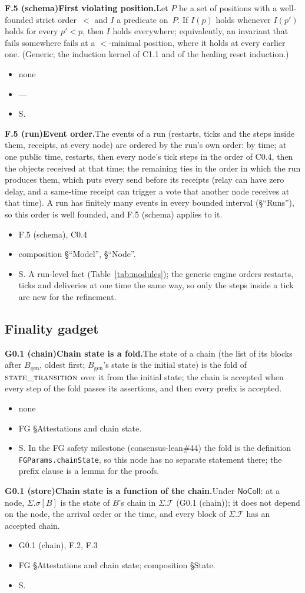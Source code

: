 \documentclass{article}
\newcommand{\genesis}{B_{\mathrm{gen}}}
\newcommand{\T}{\mathcal T}
\newcommand{\fname}[1]{\text{\textsc{#1}}}
\newcommand{\dagnode}[6]{%
\par\medskip\noindent\textbf{#1\enspace #2.}\enspace #3
\begin{itemize}[leftmargin=2.2em,itemsep=0pt,topsep=2pt]
\item[\emph{Uses}] #4
\item[\emph{Evid.}] #5
\item[\emph{Task}] #6
\end{itemize}}
\begin{document}
\dagnode{F.5 (schema)}{First violating position}{Let $P$ be a set of
positions with a well-founded strict order~$<$ and $I$ a predicate on~$P$.  If
$I(p)$ holds whenever $I(p')$ holds for every $p'<p$, then $I$ holds everywhere;
equivalently, an invariant that fails somewhere fails at a $<$-minimal position,
where it holds at every earlier one.  (Generic; the induction kernel of C1.1 and
of the healing reset induction.)}
{none}{---}{S.}

\dagnode{F.5 (run)}{Event order}{The events of a run (restarts, ticks and the
steps inside them, receipts, at every node) are ordered by the run's own order:
by time; at one public time, restarts, then every node's tick steps in the
order of C0.4, then the objects received at that time; the remaining ties in
the order in which the run produces them, which puts every send before its
receipts (relay can have zero delay, and a same-time receipt can trigger a vote
that another node receives at that time).  A run has finitely many events in
every bounded interval (\S``Runs''), so this order is well founded, and F.5
(schema) applies to it.}
{F.5 (schema), C0.4}{composition \S``Model'', \S``Node''.}{S.  A run-level fact
(Table~\ref{tab:modules}); the generic engine orders restarts, ticks and
deliveries at one time the same way, so only the steps inside a tick are new
for the refinement.}

\subsection{Finality gadget}

\dagnode{G0.1 (chain)}{Chain state is a fold}{The state of a chain (the
list of its blocks after $\genesis$, oldest first; $\genesis$'s state is the
initial state) is the fold of $\fname{state\_transition}$
over it from the initial state; the chain is accepted when every step of the
fold passes its assertions, and then every prefix is accepted.}
{none}{FG \S Attestations and chain state.}{S.  In the FG safety milestone
(consensus-lean\#44) the fold is the definition
\texttt{FGParams.chainState}, so this node has no separate statement there;
the prefix clause is a lemma for the proofs.}

\dagnode{G0.1 (store)}{Chain state is a function of the chain}{Under
$\mathsf{NoColl}$: at a node, $\Sigma.\sigma[B]$ is the state of $B$'s chain
in $\Sigma.\T$ (G0.1 (chain)); it does not depend on the node, the arrival
order or the time, and every block of $\Sigma.\T$ has an accepted chain.}
{G0.1 (chain), F.2, F.3}{FG \S Attestations and chain state; composition
\S State.}{S.}
\end{document}
